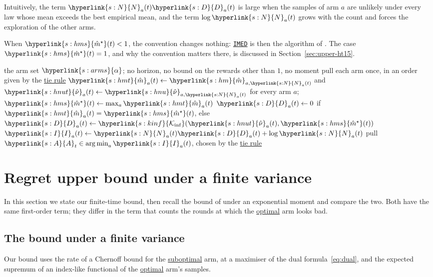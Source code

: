 \documentclass[11pt]{article}
\newcommand{\argmin}{\operatorname*{arg\,min}}
\newcommand{\sy}[2]{{\hyperlink{#1}{#2}}}
\newcommand{\term}[2]{\hyperlink{#1}{#2}}
\newcommand{\imed}{\hyperref[alg:imed]{\texttt{IMED}}}
\newcommand{\arms}{\sy{s:arms}{\alpha}}
\newcommand{\Karms}{\sy{s:K}{K}}
\newcommand{\Kinf}{\sy{s:kinf}{\mathcal{K}_{\inf}}}
\newcommand{\Ap}{\sy{s:A}{A}}
\newcommand{\Np}{\sy{s:N}{N}}
\newcommand{\hnu}{\sy{s:hnu}{\hat{\nu}}}
\newcommand{\hm}{\sy{s:hm}{\hat{m}}}
\newcommand{\hnut}{\sy{s:hnut}{\hat{\nu}}}
\newcommand{\hmt}{\sy{s:hmt}{\hat{m}}}
\newcommand{\hms}{\sy{s:hms}{\hat{m}^{\star}}}
\newcommand{\Dv}{\sy{s:D}{D}}
\newcommand{\Ix}{\sy{s:I}{I}}
\begin{document}
Intuitively, the term $\Np_a(t)\Dv_a(t)$ is large when the samples of arm $a$ are unlikely under every
law whose mean exceeds the best empirical mean, and the term $\log \Np_a(t)$ grows with the count and
forces the exploration of the other arms.

When $\hms(t)<1$, the convention changes nothing: \imed{} is then the algorithm of
\citet[Algorithm~1]{HT15}. The case $\hms(t)=1$, and why the convention matters there, is
discussed in Section~\ref{sec:upper-ht15}.

\begin{algorithm}[t]
\caption{\texttt{IMED} (Indexed Minimum Empirical Divergence)}\label{alg:imed}
\begin{algorithmic}[1]
\Require the arm set $\arms$; no horizon, no bound on the rewards other than $1$, no moment
\For{$t=0,1,\dots,\Karms-1$}
  \State pull each arm once, in an order given by the \term{w:tie}{tie rule}
\EndFor
\For{$t=\Karms,\Karms+1,\dots$}
  \State $\hmt_a(t)\gets\hm_{a,\Np_a(t)}$ and $\hnut_a(t)\gets\hnu_{a,\Np_a(t)}$ for every arm $a$;
    $\hms(t)\gets\max_a\hmt_a(t)$
  \State $\Dv_a(t)\gets0$ if $\hmt_a(t)=\hms(t)$, else $\Dv_a(t)\gets\Kinf(\hnut_a(t),\hms(t))$
  \State $\Ix_a(t)\gets \Np_a(t)\Dv_a(t)+\log \Np_a(t)$
  \State pull $\Ap_t\in\argmin_a\Ix_a(t)$, chosen by the \term{w:tie}{tie rule}
\EndFor
\end{algorithmic}
\end{algorithm}


\section{Regret upper bound under a finite variance}\label{sec:upper}

In this section we state our finite-time bound, then recall the bound of \citet{HT15} under an
exponential moment and compare the two. Both have the same first-order term; they differ in the term
that counts the rounds at which the \term{w:optimal}{optimal} arm looks bad.

\subsection{The bound under a finite variance}

Our bound uses the rate of a Chernoff bound for the \term{w:subopt}{suboptimal} arm, at a maximiser of the dual
formula~\eqref{eq:dual}, and the expected supremum of an index-like functional of the
\term{w:optimal}{optimal} arm's samples.
\end{document}
